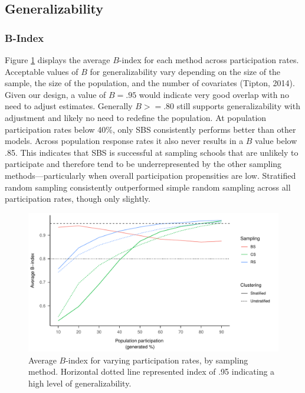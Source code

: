 \documentclass[english,man,floatsintext]{apa6}
\begin{document}
\hypertarget{generalizability-1}{%
\subsection{Generalizability}\label{generalizability-1}}

\hypertarget{b-index}{%
\subsubsection{B-Index}\label{b-index}}

Figure \ref{fig:fig-avg-B} displays the average \(B\)-index for each method across participation rates. Acceptable values of \(B\) for generalizability vary depending on the size of the sample, the size of the population, and the number of covariates (Tipton, 2014). Given our design, a value of \(B = .95\) would indicate very good overlap with no need to adjust estimates. Generally \(B >= .80\) still supports generalizability with adjustment and likely no need to redefine the population. At population participation rates below 40\%, only SBS consistently performs better than other models. Across population response rates it also never results in a \(B\) value below .85. This indicates that SBS is successful at sampling schools that are unlikely to participate and therefore tend to be underrepresented by the other sampling methods---particularly when overall participation propensities are low. Stratified random sampling consistently outperformed simple random sampling across all participation rates, though only slightly.



\begin{figure}
\centering
\includegraphics{6---Paper_files/figure-latex/fig-avg-B-1.pdf}
\caption{\label{fig:fig-avg-B}Average \(B\)-index for varying participation rates, by sampling method. Horizontal dotted line represented index of .95 indicating a high level of generalizability.}
\end{figure}
\end{document}
